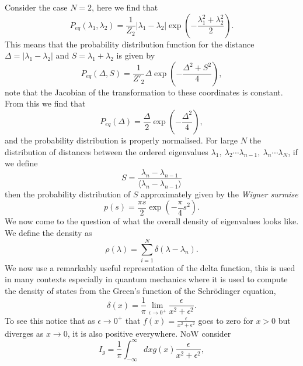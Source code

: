 \documentclass[11pt]{report}
\begin{document}
 Consider the case $N=2$, here we find that
 \begin{equation}
 P_{eq}(\lambda_1, \lambda_2) = \frac{1}{Z_2}|\lambda_1-\lambda_2|\exp(
 -\frac{\lambda_1^2 +\lambda_2^2}{2}).
 \end{equation}
 This means that the probability distribution function for the distance $\Delta=|\lambda_1-\lambda_2|$ and $S= \lambda_1+\lambda_2$ is given by
 \begin{equation}
 P_{eq}(\Delta,S ) = \frac{1}{Z'_2}\Delta\exp(
 -\frac{\Delta^2 +S^2}{4}),
 \end{equation}
 note that the Jacobian of the transformation to these coordinates is constant. From this we find that
 \begin{equation}
 P_{eq}(\Delta) = \frac{\Delta}{2} \exp(-\frac{\Delta^2}{4}),
\end{equation}
and the probability distribution is properly normalised. For large $N$ the distribution of distances between the ordered  eigenvalues $\lambda_1,\ \lambda_2 \cdots \lambda_{n-1}, \ \lambda _n \cdots \lambda_N$, if we define 
\begin{equation}
S =\frac{ \lambda_n - \lambda_{n-1}}{\langle  \lambda_n - \lambda_{n-1}\rangle}
\end{equation}
 then the probability  distribution of $S$ approximately given by the {\em Wigner surmise} 
\begin{equation}
p(s) = \frac{\pi s}{2}\exp(-\frac{\pi}{4}s^2).
\end{equation}
We now come to the question of what the overall density of eigenvalues looks like. We define the density as
\begin{equation}
\rho(\lambda) = \sum_{i=1}^N \delta(\lambda-\lambda_n).
\end{equation}
We now use a remarkably useful representation of the delta function, this is used in many contexts especially in quantum mechanics where it is used to compute the density of states from the Green's function of the Schr\"odinger equation,
\begin{equation}
\delta(x) = \frac{1}{\pi}\lim_{\epsilon \to 0^+} \frac{\epsilon}{x^2 + \epsilon^2}.
\end{equation} 
To see this notice that as $\epsilon\to 0^+$ that $f(x) = \frac{\epsilon}{x^2 + \epsilon^2}$ goes to zero for $x>0$ but diverges as $x\to 0$, it is also positive everywhere. NoW consider
\begin{equation}
I_g = \frac{1}{\pi}\int_{-\infty}^{\infty} dx g(x) \frac{\epsilon}{x^2 + \epsilon^2} ,
\end{equation}
\end{document}
